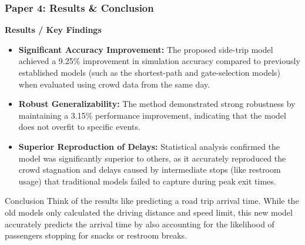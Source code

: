 \documentclass{beamer}
\begin{document}
\begin{frame}
\frametitle{Paper 4: Results \& Conclusion}
\scriptsize

\textbf{Results / Key Findings}
\begin{itemize}
    \item \textbf{Significant Accuracy Improvement:} The proposed side-trip model achieved a 9.25\% improvement in simulation accuracy compared to previously established models (such as the shortest-path and gate-selection models) when evaluated using crowd data from the same day.
    \item \textbf{Robust Generalizability:} The method demonstrated strong robustness by maintaining a 3.15\% performance improvement, indicating that the model does not overfit to specific events.
    \item \textbf{Superior Reproduction of Delays:} Statistical analysis confirmed the model was significantly superior to others, as it accurately reproduced the crowd stagnation and delays caused by intermediate stops (like restroom usage) that traditional models failed to capture during peak exit times.
\end{itemize}

\begin{alertblock}{Conclusion}
Think of the results like predicting a road trip arrival time. While the old models only calculated the driving distance and speed limit, this new model accurately predicts the arrival time by also accounting for the likelihood of passengers stopping for snacks or restroom breaks.
\end{alertblock}
\end{frame}
\end{document}
